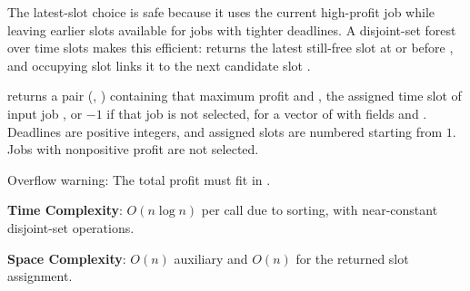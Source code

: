 The latest-slot choice is safe because it uses the current high-profit job while leaving earlier slots available for jobs with tighter deadlines. A disjoint-set forest over time slots makes this efficient:  returns the latest still-free slot at or before , and occupying slot  links it to the next candidate slot .

\begin{compactitem}
  \item {} returns a pair (, ) containing that maximum profit and , the assigned time slot of input job , or $-1$ if that job is not selected, for a vector of  with fields  and . Deadlines are positive integers, and assigned slots are numbered starting from $1$. Jobs with nonpositive profit are not selected.
\end{compactitem}

Overflow warning: The total profit must fit in .

\textbf{Time Complexity}: $O(n \log n)$ per call due to sorting, with near-constant disjoint-set operations.

\textbf{Space Complexity}: $O(n)$ auxiliary and $O(n)$ for the returned slot assignment.

